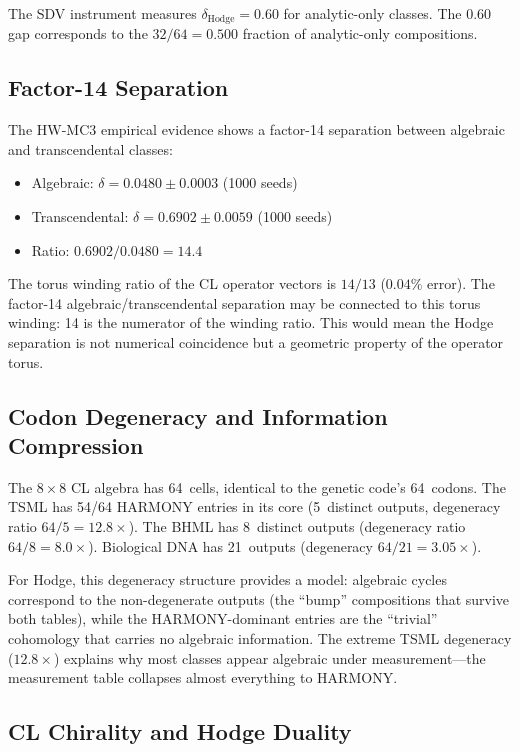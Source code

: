 \documentclass[11pt]{article}
\theoremstyle{definition}
\begin{document}
The SDV instrument measures $\delta_{\text{Hodge}} = 0.60$ for
analytic-only classes.  The $0.60$ gap corresponds to the
$32/64 = 0.500$ fraction of analytic-only compositions.

\subsection{Factor-14 Separation}

The HW-MC3 empirical evidence shows a factor-14 separation between
algebraic and transcendental classes:

\begin{itemize}
  \item Algebraic: $\delta = 0.0480 \pm 0.0003$ \;(1000 seeds)
  \item Transcendental: $\delta = 0.6902 \pm 0.0059$ \;(1000 seeds)
  \item Ratio: $0.6902 / 0.0480 = 14.4$
\end{itemize}

\noindent
The torus winding ratio of the CL operator vectors is $14/13$
($0.04\%$ error).  The factor-14 algebraic/transcendental separation may
be connected to this torus winding: 14 is the numerator of the winding
ratio.  This would mean the Hodge separation is not numerical
coincidence but a geometric property of the operator torus.

\subsection{Codon Degeneracy and Information Compression}

The $8\times 8$ CL algebra has 64~cells, identical to the genetic code's
64~codons.  The TSML has 54/64 HARMONY entries in its core (5~distinct
outputs, degeneracy ratio $64/5 = 12.8\times$).  The BHML has 8~distinct
outputs (degeneracy ratio $64/8 = 8.0\times$).  Biological DNA has
21~outputs (degeneracy $64/21 = 3.05\times$).

For Hodge, this degeneracy structure provides a model: algebraic cycles
correspond to the non-degenerate outputs (the ``bump'' compositions that
survive both tables), while the HARMONY-dominant entries are the
``trivial'' cohomology that carries no algebraic information.  The
extreme TSML degeneracy ($12.8\times$) explains why most classes appear
algebraic under measurement---the measurement table collapses almost
everything to HARMONY.

\subsection{CL Chirality and Hodge Duality}
\end{document}
